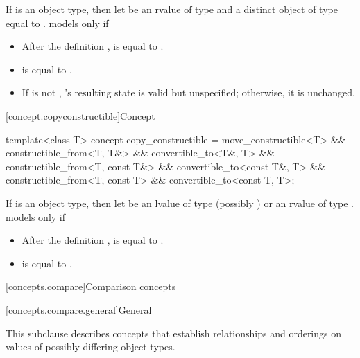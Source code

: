 \begin{itemdescr}
\pnum
If  is an object type, then let  be an rvalue of type
 and  a distinct object of type  equal to
.  models  only if

\begin{itemize}
\item After the definition ,  is equal to .

\item {} is equal to .

\item If  is not , 's resulting state is valid
but unspecified; otherwise, it is unchanged.
\end{itemize}
\end{itemdescr}

[concept.copyconstructible]{Concept }

%
\begin{itemdecl}
template<class T>
  concept copy_constructible =
    move_constructible<T> &&
    constructible_from<T, T&> && convertible_to<T&, T> &&
    constructible_from<T, const T&> && convertible_to<const T&, T> &&
    constructible_from<T, const T> && convertible_to<const T, T>;
\end{itemdecl}

\begin{itemdescr}
\pnum
If  is an object type, then let  be an lvalue of type
(possibly )  or an rvalue of type .
 models  only if

\begin{itemize}
\item After the definition ,  is equal to .

\item {} is equal to .
\end{itemize}

\end{itemdescr}

[concepts.compare]{Comparison concepts}

[concepts.compare.general]{General}

\pnum
This subclause describes concepts that establish relationships and orderings
on values of possibly differing object types.

